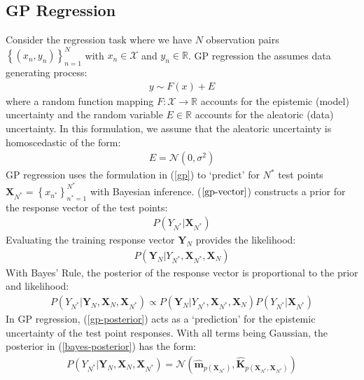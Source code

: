 \documentclass{article}
\numberwithin{equation}{section}
\begin{document}
\subsection{GP Regression}
Consider the regression task where we have $N$ observation pairs $\left\{(x_n, y_n)\right\}_{n=1}^{N}$ with $x_n \in \mathcal{X}$ and $y_n \in \mathbb{R}$. GP regression the assumes data generating process:
\begin{align}
    y \sim F(x) + E
    \label{regression-data-uncertainties}
\end{align}
where a random function mapping $F: \mathcal{X} \rightarrow \mathbb{R}$ accounts for the epistemic (model) uncertainty and the random variable $E \in \mathbb{R}$ accounts for the aleatoric (data) uncertainty. In this formulation, we assume that the aleatoric uncertainty is homoscedastic of the form:
\begin{align}
    E = \mathcal{N} (0, \sigma^2)
    \label{aleotric-uncertainty}
\end{align}
GP regression uses the formulation in (\ref{gp}) to `predict' for $N^*$ test points $\mathbf{X}_{N^*} = \left\{ x_{n^*}\right\}_{n^*=1}^{N^*}$ with Bayesian inference. ($\ref{gp-vector}$) constructs a prior for the response vector of the test points:
\begin{align}
    \label{gp-prior}
    P\left(Y_{N^*}\vert \mathbf{X}_{N^*}\right)
\end{align}
Evaluating the training response vector $\mathbf{Y}_{N}$ provides the likelihood:
\begin{align}
     \label{gp-likelihood}
    P\left(\mathbf{Y}_{N} \vert Y_{N^*}, \mathbf{X}_{N^*}, \mathbf{X}_{N} \right)
\end{align}
With Bayes' Rule, the posterior of the response vector is proportional to the prior and likelihood:
\begin{align}
     P\left(Y_{N^*} | \mathbf{Y}_{N},  \mathbf{X}_{N},  \mathbf{X}_{N^*}\right) \propto P\left(\mathbf{Y}_{N} \vert Y_{N^*}, \mathbf{X}_{N^*}, \mathbf{X}_{N} \right) P\left(Y_{N^*}\vert \mathbf{X}_{N^*}\right)
    \label{bayes-posterior}
\end{align}
In GP regression, (\ref{gp-posterior}) acts as a `prediction' for the epistemic uncertainty of the test point responses. With all terms being Gaussian, the posterior in (\ref{bayes-posterior}) has the form:
\begin{align}
    P\left(Y_{N^*} | \mathbf{Y}_{N},  \mathbf{X}_{N},  \mathbf{X}_{N^*}\right)  =  \mathcal{N}\left(\hat{\mathbf{m}}_{p(\mathbf{X}_{N^*})}, \hat{\mathbf{K}}_{p(\mathbf{X}_{N^*}, \mathbf{X}_{N^*})}\right)
    \label{gp-epistemic-posterior}
\end{align}
\end{document}
